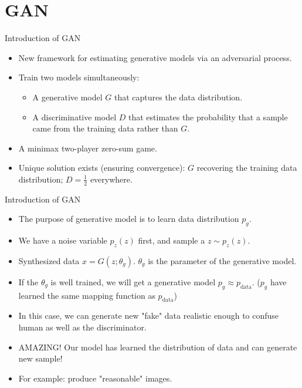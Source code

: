 \documentclass[10pt]{beamer}
\newcommand{\subtitlepage}[3]{\title{#1}\subtitle{#2}\author{#3}\date{}\begin{frame}[plain]\titlepage\end{frame}}
\begin{document}
	\part{GAN}
	\subtitlepage{}{Generative Adversarial Nets}{Ian J. Goodfellow, Jean Pouget-Abadie, Mehdi Mirza, Bing Xu, \\ David Warde-Farley, Sherjil Ozair, Aaron Courville, Yoshua Bengio. \\ NIPS 2014\\ arXiv: 1406.2661}
	
	\begin{frame}{Introduction of GAN}
		\begin{itemize}
			\item New framework for estimating generative models via an adversarial process.
			\item Train two models simultaneously:
			\begin{itemize}
				\item A generative model $G$ that captures the data distribution.
				\item A discriminative model $D$ that estimates the probability that a sample came from the training data rather than $G$.
			\end{itemize}
			\item A minimax two-player zero-sum game.
			\item Unique solution exists (ensuring convergence): $G$ recovering the training data distribution; $D=\frac{1}{2}$ everywhere.
		\end{itemize}
	\end{frame}

	\begin{frame}{Introduction of GAN}
		\begin{itemize}
			\item The purpose of generative model is to learn data distribution $p_g$.
			\item We have a noise variable $p_z(z)$ first, and sample a $z\sim p_z(z)$.
			\item Synthesized data $\hat{x}=G(z;\theta_g)$. $\theta_g$ is the parameter of the generative model.
			\item If the $\theta_g$ is well trained, we will get a generative model $p_g\approx p_{\text{data}}$. ($p_g$ have learned the same mapping function as $p_{\text{data}}$)
			\item In this case, we can generate new "fake" data realistic enough to confuse human as well as the discriminator.
			\item AMAZING! Our model has learned the distribution of data and can generate new sample!
			\item For example: produce "reasonable" images.
		\end{itemize}
	\end{frame}
\end{document}
